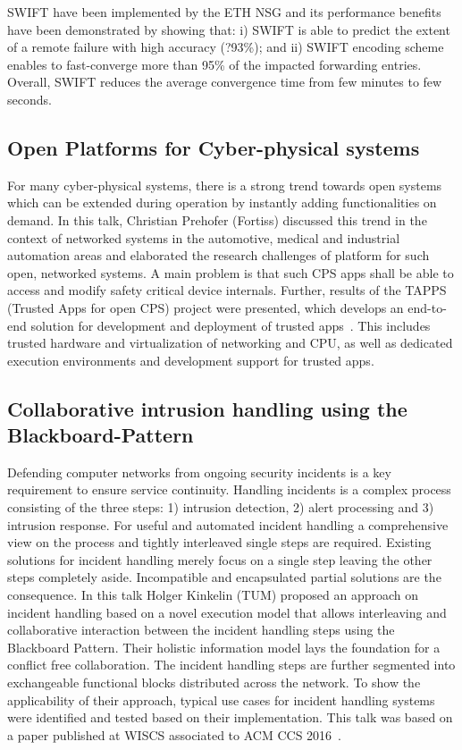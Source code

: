 SWIFT have been implemented by the ETH \ac{NSG} and its performance benefits
have been demonstrated by showing that: i) SWIFT is able to predict the extent
of a remote failure with high accuracy (?93\%); and ii) SWIFT encoding scheme
enables to fast-converge more than 95\% of the impacted forwarding entries.
Overall, SWIFT reduces the average convergence time from few minutes to few
seconds.


\subsection{Open Platforms for Cyber-physical systems}

For many cyber-physical systems, there is a strong trend towards open systems
which can be extended during operation by instantly adding functionalities on
demand. In this talk, Christian Prehofer (Fortiss) discussed this trend in the
context of networked systems in the automotive, medical and industrial
automation areas and elaborated the research challenges of platform for such
open, networked systems. A main problem is that such CPS apps shall be able to
access and modify safety critical device internals. Further, results of the
TAPPS (Trusted Apps for open CPS) project were presented, which  develops an
end-to-end solution for development and deployment of trusted
apps~\cite{Prehofer2016}. This includes trusted hardware and virtualization of
networking and CPU, as well as dedicated execution environments and
development support for trusted apps.


\subsection{Collaborative intrusion handling using the Blackboard-Pattern}

Defending computer networks from ongoing security incidents is a key
requirement to ensure service continuity. Handling incidents is a complex
process consisting of the three steps: 1) intrusion detection, 2) alert
processing and 3) intrusion response. For useful and automated incident
handling a comprehensive view on the process and tightly interleaved single
steps are required. Existing solutions for incident handling merely focus on a
single step leaving the other steps completely aside. Incompatible and
encapsulated partial solutions are the consequence. In this talk Holger
Kinkelin (TUM) proposed an approach on incident handling based on a novel
execution model that allows interleaving and collaborative interaction between
the incident handling steps using the Blackboard Pattern. Their holistic
information model lays the foundation for a conflict free collaboration. The
incident handling steps are further segmented into exchangeable functional
blocks distributed across the network. To show the applicability of their
approach, typical use cases for incident handling systems were identified and
tested based on their implementation. This talk was based on a paper published
at WISCS associated to ACM CCS 2016~\cite{Herold2016}.

